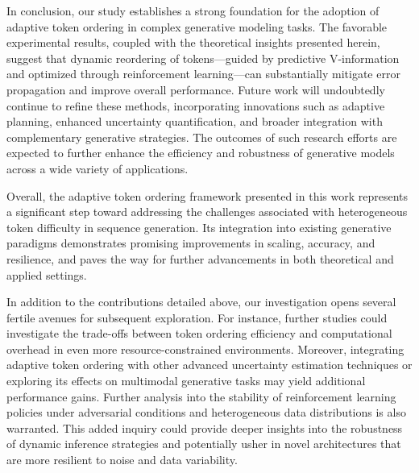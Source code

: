 \documentclass{article}
\begin{document}
\par In conclusion, our study establishes a strong foundation for the adoption of adaptive token ordering in complex generative modeling tasks. The favorable experimental results, coupled with the theoretical insights presented herein, suggest that dynamic reordering of tokens—guided by predictive V-information and optimized through reinforcement learning—can substantially mitigate error propagation and improve overall performance. Future work will undoubtedly continue to refine these methods, incorporating innovations such as adaptive planning, enhanced uncertainty quantification, and broader integration with complementary generative strategies. The outcomes of such research efforts are expected to further enhance the efficiency and robustness of generative models across a wide variety of applications.

\par Overall, the adaptive token ordering framework presented in this work represents a significant step toward addressing the challenges associated with heterogeneous token difficulty in sequence generation. Its integration into existing generative paradigms demonstrates promising improvements in scaling, accuracy, and resilience, and paves the way for further advancements in both theoretical and applied settings.

\par In addition to the contributions detailed above, our investigation opens several fertile avenues for subsequent exploration. For instance, further studies could investigate the trade-offs between token ordering efficiency and computational overhead in even more resource-constrained environments. Moreover, integrating adaptive token ordering with other advanced uncertainty estimation techniques or exploring its effects on multimodal generative tasks may yield additional performance gains. Further analysis into the stability of reinforcement learning policies under adversarial conditions and heterogeneous data distributions is also warranted. This added inquiry could provide deeper insights into the robustness of dynamic inference strategies and potentially usher in novel architectures that are more resilient to noise and data variability.
\end{document}
